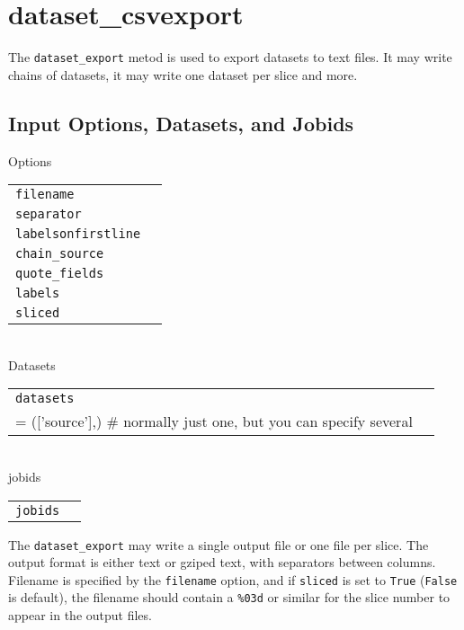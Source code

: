 \clearpage
\section{dataset\_csvexport}

The \texttt{dataset\_export} metod is used to export datasets to text
files.  It may write chains of datasets, it may write one dataset per
slice and more.


\subsection{Input Options, Datasets, and Jobids}

\noindent Options\\

\begin{tabular}{ll}
  \texttt{filename} & \\ %
  \texttt{separator} & \\ %
  \texttt{labelsonfirstline} & \\ %
  \texttt{chain\_source} & \\ %
  \texttt{quote\_fields} & \\ %
  \texttt{labels} & \\ %
  \texttt{sliced} & \\ %
\end{tabular}\\

\noindent Datasets\\

\begin{tabular}{ll}
  \texttt{datasets} & \\   = (['source'],) \# normally just one, but you can specify several
\end{tabular}\\

\noindent jobids\\

\begin{tabular}{ll}
  \texttt{jobids} & \\ %
\end{tabular}


The \texttt{dataset\_export} may write a single output file or one
file per slice.  The output format is either text or gziped text, with
separators between columns.  Filename is specified by the
\texttt{filename} option, and if \texttt{sliced} is set to
\texttt{True} (\texttt{False} is default), the filename should contain
a \texttt{\%03d} or similar for the slice number to appear in the
output files.

